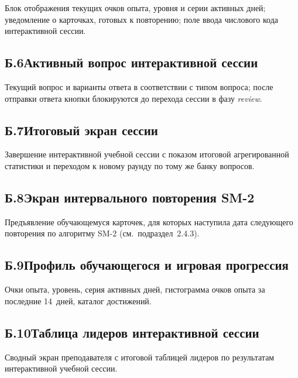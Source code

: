 Блок отображения текущих очков опыта, уровня и серии активных
дней; уведомление о карточках, готовых к повторению; поле ввода
числового кода интерактивной сессии.


\subsection*{Б.6\quad Активный вопрос интерактивной сессии}

Текущий вопрос и варианты ответа в соответствии с типом вопроса;
после отправки ответа кнопки блокируются до перехода сессии в фазу
\emph{review}.


\subsection*{Б.7\quad Итоговый экран сессии}

Завершение интерактивной учебной сессии с показом итоговой
агрегированной статистики и переходом к новому раунду по тому же
банку вопросов.


\subsection*{Б.8\quad Экран интервального повторения SM-2}

Предъявление обучающемуся карточек, для которых наступила дата
следующего повторения по алгоритму SM-2 (см.~подраздел~2.4.3).


\subsection*{Б.9\quad Профиль обучающегося и игровая прогрессия}

Очки опыта, уровень, серия активных дней, гистограмма очков
опыта за последние 14~дней, каталог достижений.


\subsection*{Б.10\quad Таблица лидеров интерактивной сессии}

Сводный экран преподавателя с итоговой таблицей лидеров
по результатам интерактивной учебной сессии.

